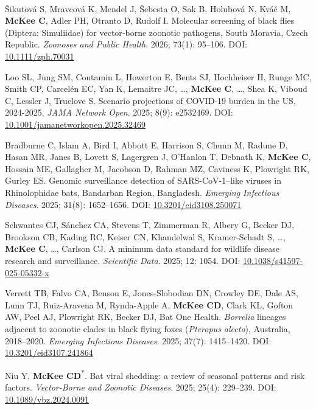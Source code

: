 \documentclass{cv}
\begin{document}
\begin{pubenum}
\item Šikutová S\textsuperscript{\dag}, Mravcová K\textsuperscript{\dag}, Mendel J, Šebesta O, Sak B, Holubová N, Kváč M, \textbf{McKee C}, Adler PH, Otranto D, Rudolf I. Molecular screening of black flies (Diptera: Simuliidae) for vector‐borne zoonotic pathogens, South Moravia, Czech Republic. \textit{Zoonoses and Public Health}. 2026; 73(1): 95--106. DOI: \href{https://doi.org/10.1111/zph.70031}{10.1111/zph.70031}

\item Loo SL, Jung SM, Contamin L, Howerton E, Bents SJ, Hochheiser H, Runge MC, Smith CP, Carcelén EC, Yan K, Lemaitre JC, …, \textbf{McKee C}, …,  Shea K, Viboud C, Lessler J, Truelove S. Scenario projections of COVID-19 burden in the US, 2024-2025. \textit{JAMA Network Open}. 2025; 8(9): e2532469. DOI: \href{https://doi.org/10.1001/jamanetworkopen.2025.32469}{10.1001/jamanetworkopen.2025.32469}

\item Bradburne C, Islam A, Bird I, Abbott E, Harrison S, Chunn M, Radune D, Hasan MR, Janes B, Lovett S, Lagergren J, O'Hanlon T, Debnath K, \textbf{McKee C}, Hossain ME, Gallagher M, Jacobson D, Rahman MZ, Caviness K, Plowright RK, Gurley ES. Genomic surveillance detection of SARS-CoV-1--like viruses in Rhinolophidae bats, Bandarban Region, Bangladesh. \textit{Emerging Infectious Diseases}. 2025; 31(8): 1652--1656. DOI: \href{https://doi.org/10.3201/eid3108.250071}{10.3201/eid3108.250071}

\item Schwantes CJ, Sánchez CA, Stevens T, Zimmerman R, Albery G, Becker DJ, Brookson CB, Kading RC, Keiser CN, Khandelwal S, Kramer-Schadt S, …, \textbf{McKee C}, …, Carlson CJ.  A minimum data standard for wildlife disease research and surveillance. \textit{Scientific Data}. 2025; 12: 1054. DOI: \href{https://doi.org/10.1038/s41597-025-05332-x}{10.1038/s41597-025-05332-x}

\item Verrett TB, Falvo CA, Benson E, Jones-Slobodian DN, Crowley DE, Dale AS, Lunn TJ, Ruiz-Aravena M, Rynda-Apple A, \textbf{McKee CD}, Clark KL, Gofton AW, Peel AJ, Plowright RK, Becker DJ, Bat One Health. \textit{Borrelia} lineages adjacent to zoonotic clades in black flying foxes (\textit{Pteropus alecto}), Australia, 2018–2020.  \textit{Emerging Infectious Diseases}. 2025; 37(7): 1415--1420. DOI: \href{https://doi.org/10.3201/eid3107.241864}{10.3201/eid3107.241864}

\item Niu Y\textsuperscript{\ddag}, \textbf{McKee CD}\textsuperscript{*}. Bat viral shedding: a review of seasonal patterns and risk factors. \textit{Vector-Borne and Zoonotic Diseases}. 2025; 25(4): 229--239. DOI: \href{https://doi.org/10.1089/vbz.2024.0091}{10.1089/vbz.2024.0091}


\end{pubenum}
\end{document}
